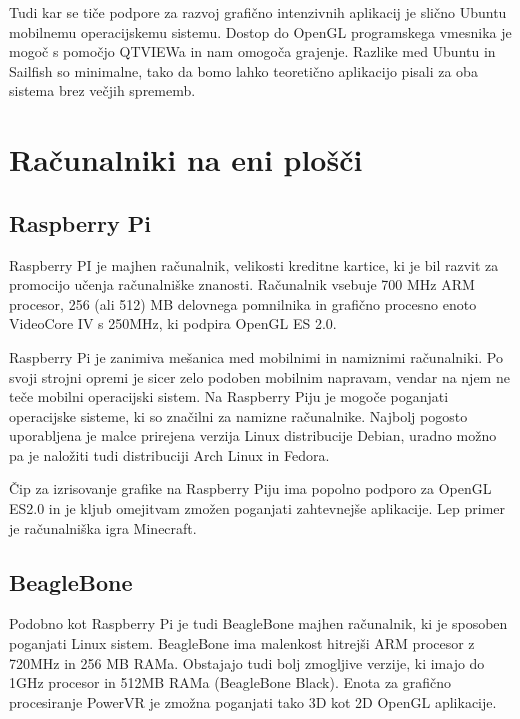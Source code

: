 Tudi kar se tiče podpore za razvoj grafično intenzivnih aplikacij je slično Ubuntu mobilnemu operacijskemu sistemu. Dostop do OpenGL programskega vmesnika je mogoč s pomočjo QTVIEWa in nam omogoča grajenje. Razlike med Ubuntu in Sailfish so minimalne, tako da bomo lahko teoretično aplikacijo pisali za oba sistema brez večjih sprememb.

\section{Računalniki na eni plošči}

\subsection{Raspberry Pi}
\label{sec:raspberryPi}

Raspberry PI je majhen računalnik, velikosti kreditne kartice, ki je bil razvit za promocijo učenja računalniške znanosti. Računalnik vsebuje 700 MHz ARM procesor, 256 (ali 512) MB delovnega pomnilnika in grafično procesno enoto VideoCore IV s 250MHz, ki podpira OpenGL ES 2.0.

Raspberry Pi je zanimiva mešanica med mobilnimi in namiznimi računalniki. Po svoji strojni opremi je sicer zelo podoben mobilnim napravam, vendar na njem ne teče mobilni operacijski sistem. Na Raspberry Piju je mogoče poganjati operacijske sisteme, ki so značilni za namizne računalnike. Najbolj pogosto uporabljena je malce prirejena verzija Linux distribucije Debian, uradno možno pa je naložiti tudi distribuciji Arch Linux in Fedora.

Čip za izrisovanje grafike na Raspberry Piju ima popolno podporo za OpenGL ES2.0 in je kljub omejitvam zmožen poganjati zahtevnejše aplikacije.  Lep primer je računalniška igra Minecraft.


\subsection{BeagleBone}

Podobno kot Raspberry Pi je tudi BeagleBone majhen računalnik, ki je sposoben poganjati Linux sistem. BeagleBone ima malenkost hitrejši ARM procesor z 720MHz in 256 MB RAMa. Obstajajo tudi bolj zmogljive verzije, ki imajo do 1GHz procesor in 512MB RAMa (BeagleBone Black). Enota za grafično procesiranje PowerVR je zmožna poganjati tako 3D kot 2D OpenGL aplikacije.

